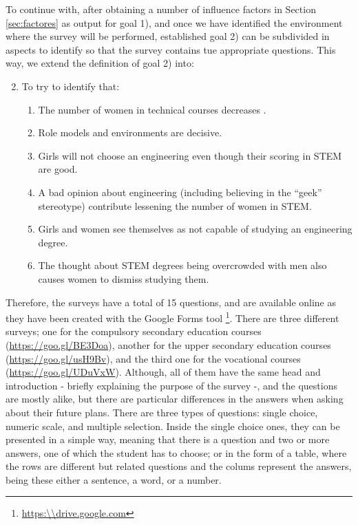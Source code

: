 \documentclass[journal,transmag]{IEEEtran}
\begin{document}
To continue with, after obtaining a number of influence factors in Section \ref{sec:factores} as output for goal 1), and once we have identified the environment where the survey will be performed, established goal 2) can be subdivided in aspects to identify so that the survey contains tue appropriate questions. This way, we extend the definition of goal 2) into:

\begin{enumerate}
  \setcounter{enumi}{1}
  \item To try to identify that:
  \begin{enumerate}
  \item The number of women in technical courses decreases .
  \item Role models and environments are decisive.
  \item Girls will not choose an engineering even though their scoring in STEM are good.
  \item A bad opinion about engineering (including believing in the ``geek'' stereotype) contribute lessening the number of women in STEM.
  \item Girls and women see themselves as not capable of studying an engineering degree.
  \item The thought about STEM degrees being overcrowded with men also causes women to dismiss studying them.
  \end{enumerate}
\end{enumerate}

Therefore, the surveys have a total of 15 questions, and are available online as they have been created with the Google Forms tool \footnote{\url{https:\\drive.google.com}}. There are three different surveys; one for the compulsory secondary education courses (\url{https://goo.gl/BE3Doa}), another for the upper secondary education courses (\url{https://goo.gl/usH9Bv}), and the third one for the vocational courses (\url{https://goo.gl/UDuVxW}). Although, all of them have the same head and introduction - briefly explaining the purpose of the survey -\cite{cohen2013research}, and the questions are mostly alike, but there are particular differences in the answers when asking about their future plans. There are three types of questions: single choice, numeric scale, and multiple selection. Inside the single choice ones, they can be presented in a simple way, meaning that there is a question and two or more answers, one of which the student has to choose; or in the form of a table, where the rows are different but related questions and the colums represent the answers, being these either a sentence, a word, or a number.
\end{document}
